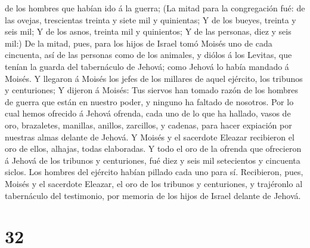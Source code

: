 de los hombres que habían ido á la guerra;  (La mitad para
la congregación fué: de las ovejas, trescientas treinta y siete mil y
quinientas;  Y de los bueyes, treinta y seis mil;
 Y de los asnos, treinta mil y quinientos;  Y
de las personas, diez y seis mil:)  De la mitad, pues, para
los hijos de Israel tomó Moisés uno de cada cincuenta, así de las
personas como de los animales, y diólos á los Levitas, que tenían la
guarda del tabernáculo de Jehová; como Jehová lo había mandado á Moisés.
 Y llegaron á Moisés los jefes de los millares de aquel
ejército, los tribunos y centuriones;  Y dijeron á Moisés:
Tus siervos han tomado razón de los hombres de guerra que están en
nuestro poder, y ninguno ha faltado de nosotros.  Por lo
cual hemos ofrecido á Jehová ofrenda, cada uno de lo que ha hallado,
vasos de oro, brazaletes, manillas, anillos, zarcillos, y cadenas, para
hacer expiación por nuestras almas delante de Jehová.  Y
Moisés y el sacerdote Eleazar recibieron el oro de ellos, alhajas, todas
elaboradas.  Y todo el oro de la ofrenda que ofrecieron á
Jehová de los tribunos y centuriones, fué diez y seis mil setecientos y
cincuenta siclos.  Los hombres del ejército habían pillado
cada uno para sí.  Recibieron, pues, Moisés y el sacerdote
Eleazar, el oro de los tribunos y centuriones, y trajéronlo al
tabernáculo del testimonio, por memoria de los hijos de Israel delante
de Jehová.

\hypertarget{section-31}{%
\section{32}\label{section-31}}

